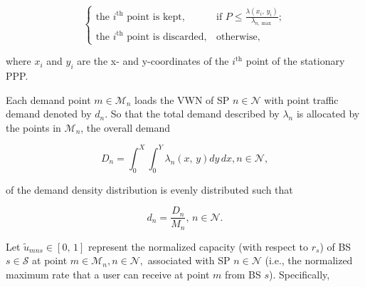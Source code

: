 \documentclass[12pt,dvipsnames]{report}
\newif\ifisdoublespacing
\begin{document}
\ifisdoublespacing
	\begin{singlespacing}
		\begin{equation} \label{eq:nsPPPaccrej}
			\begin{cases}
				\text{the $i^{\text{th}}$ point is kept},& \text{if } P \leq \frac{\lambda\left( x_i,\, y_i \right)}{\lambda_{n,\max}};\\
				\\
				\text{the $i^{\text{th}}$ point is discarded},& \text{otherwise,}
			\end{cases}
		\end{equation}
	\end{singlespacing}
\else
	\begin{equation} \label{eq:nsPPPaccrej}
		\begin{cases}
			\text{the $i^{\text{th}}$ point is kept},& \text{if } P \leq \frac{\lambda\left( x_i,\, y_i \right)}{\lambda_{n,\max}};\\
			\text{the $i^{\text{th}}$ point is discarded},& \text{otherwise,}
		\end{cases}
	\end{equation}
\fi

\noindent where $x_i$ and $y_i$ are the x- and y-coordinates of the $i^{\text{th}}$ point of the stationary PPP.

Each demand point $m \in \mathcal{M}_n$ loads the VWN of SP $n \in \mathcal{N}$ with point traffic demand denoted by $d_{n}$.  So that the total demand described by $\lambda_n$ is allocated by the points in $\mathcal{M}_n$, the overall demand 

\begin{equation} \label{eq:demandintegral}
	D_n = \int_0^X \int_0^Y \lambda_n\left( x,\, y \right) dy \, dx, n \in \mathcal{N},
\end{equation}

\noindent of the demand density distribution is evenly distributed such that

\begin{equation} \label{eq:pointdemand}
	d_{n} = \frac{D_n}{M_n},\, n \in \mathcal{N}.
\end{equation}

Let $\tilde{u}_{mns} \in \left[ 0,\, 1 \right]$ represent the normalized capacity (with respect to $r_s$) of BS $s \in \mathcal{S}$ at point $m \in \mathcal{M}_n, n \in \mathcal{N},$ associated with SP $n \in \mathcal{N}$ (i.e., the normalized maximum rate that a user can receive at point $m$ from BS $s$).  Specifically,
\end{document}
